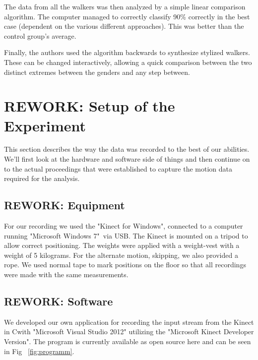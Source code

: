 \documentclass[a4paper]{article}
\newcommand{\CS}{C\nolinebreak\hspace{-.05em}\raisebox{.6ex}{\scriptsize\bf \#\ }}
\begin{document}
The data from all the walkers was then analyzed by a simple linear comparison algorithm.
The computer managed to correctly classify 90\% correctly in the best case (dependent on the various different approaches).
This was better than the control group's average.

Finally, the authors used the algorithm backwards to synthesize stylized walkers.
These can be changed interactively, allowing a quick comparison between the two distinct extremes between the genders and any step between.

\section{REWORK: Setup of the Experiment}

This section describes the way the data was recorded to the best of our abilities.
We'll first look at the hardware and software side of things and then continue on to the actual proceedings that were established to capture the motion data required for the analysis.

\subsection{REWORK: Equipment}

For our recording we used the "Kinect for Windows"\texttrademark \cite{kinect}, connected to a computer running "Microsoft Windows 7"\textregistered \ via USB.
The Kinect is mounted on a tripod to allow correct positioning.
The weights were applied with a weight-vest with a weight of 5 kilograms.
For the alternate motion, skipping, we also provided a rope.
We used normal tape to mark positions on the floor so that all recordings were made with the same measurements.

\subsection{REWORK: Software}

We developed our own application for recording the input stream from the Kinect in \CS with "Microsoft Visual Studio 2012" utilizing the "Microsoft Kinect Developer Version".
The program is currently available as open source here \cite{csprogram} and can be seen in Fig ~\ref{fig:programm}.
\end{document}
